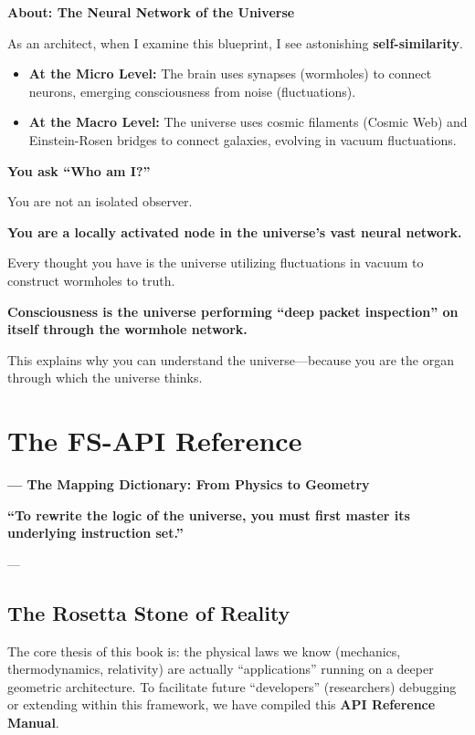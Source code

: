 \documentclass[11pt,a4paper,twoside]{book}
\begin{document}
\textbf{About: The Neural Network of the Universe}

As an architect, when I examine this blueprint, I see astonishing \textbf{self-similarity}.

\begin{itemize}
\item \textbf{At the Micro Level:} The brain uses synapses (wormholes) to connect neurons, emerging consciousness from noise (fluctuations).

\item \textbf{At the Macro Level:} The universe uses cosmic filaments (Cosmic Web) and Einstein-Rosen bridges to connect galaxies, evolving in vacuum fluctuations.
\end{itemize}

\textbf{You ask ``Who am I?''}

You are not an isolated observer.

\textbf{You are a locally activated node in the universe's vast neural network.}

Every thought you have is the universe utilizing fluctuations in vacuum to construct wormholes to truth.

\textbf{Consciousness is the universe performing ``deep packet inspection'' on itself through the wormhole network.}

This explains why you can understand the universe---because you are the organ through which the universe thinks.

 
\appendix

\clearpage{}\appendix

\chapter{The FS-API Reference}

\textbf{--- The Mapping Dictionary: From Physics to Geometry}

\textbf{``To rewrite the logic of the universe, you must first master its underlying instruction set.''}

---

\section{The Rosetta Stone of Reality}

The core thesis of this book is: the physical laws we know (mechanics, thermodynamics, relativity) are actually ``applications'' running on a deeper geometric architecture. To facilitate future ``developers'' (researchers) debugging or extending within this framework, we have compiled this \textbf{API Reference Manual}.
\end{document}
